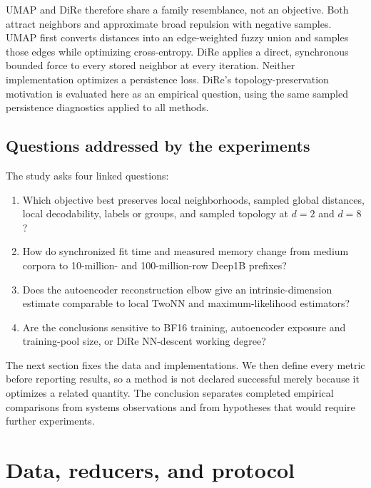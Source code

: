 \documentclass[10pt]{article}
\begin{document}
UMAP and DiRe therefore share a family resemblance, not an objective.  Both attract
neighbors and approximate broad repulsion with negative samples.  UMAP first converts
distances into an edge-weighted fuzzy union and samples those edges while optimizing
cross-entropy.  DiRe applies a direct, synchronous bounded force to every stored
neighbor at every iteration.  Neither implementation optimizes a persistence loss.
DiRe's topology-preservation motivation is evaluated here as an empirical question,
using the same sampled persistence diagnostics applied to all methods.

\subsection{Questions addressed by the experiments}

The study asks four linked questions:
\begin{enumerate}[label=(\roman*)]
  \item Which objective best preserves local neighborhoods, sampled global distances,
        local decodability, labels or groups, and sampled topology at $d=2$ and $d=8$?
  \item How do synchronized fit time and measured memory change from medium corpora to
        10-million- and 100-million-row Deep1B prefixes?
  \item Does the autoencoder reconstruction elbow give an intrinsic-dimension estimate
        comparable to local TwoNN and maximum-likelihood estimators?
  \item Are the conclusions sensitive to BF16 training, autoencoder exposure and
        training-pool size, or DiRe NN-descent working degree?
\end{enumerate}
The next section fixes the data and implementations.  We then define every metric before
reporting results, so a method is not declared successful merely because it optimizes a
related quantity.  The conclusion separates completed empirical comparisons from
systems observations and from hypotheses that would require further experiments.

\section{Data, reducers, and protocol}
\end{document}
